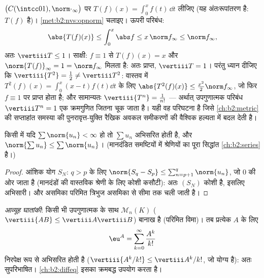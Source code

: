 \begin{example}[समाकलन का संकारक मानदंड]\label{ex:b2:nvs:integrationnorm}
$\bigl(C(\intcc01), \norm\cdot_\infty\bigr)$ पर $T(f)(x) =
\int_0^x f(t)\,\dd t$ लीजिए (यह अंतःरूपांतरण है: $T(f)$  है)। \cref{met:b2:nvs:opnorm} चलाइए। ऊपरी
परिबंध:
\[
\abs{T(f)(x)} \leq \int_0^x\abs f \leq x\,\norm f_\infty \leq
\norm f_\infty ,
\]
अतः $\vertiii T \leq 1$। साक्षी: $f \equiv 1$ से $T(f)(x) =
x$ और $\norm{T(f)}_\infty = 1 = \norm f_\infty$ मिलता है: अतः प्राप्त, $\vertiii T = 1$। परंतु
ध्यान दीजिए कि $\vertiii{T^2} = \frac12 \neq
\vertiii T^2$: वास्तव में $T^2(f)(x) = \int_0^x(x - t)f(t)\dd t$ के लिए $\abs{T^2(f)(x)} \leq \frac{x^2}2\norm f_\infty$, जो फिर $f \equiv 1$ पर
प्राप्त होता है; और सामान्यतः $\vertiii{T^n} = \frac1{n!}$ --- अर्थात् उपगुणात्मक परिबंध $\vertiii T^n = 1$
एक क्रमगुणित जितना चूक जाता है। यही वह परिघटना है जिसे \cref{ch:b2:metric} की
सप्ताहांत समस्या की पुनरावृत्त-युक्ति रैखिक अवकल समीकरणों की वैश्विक
हल्यता में बदल देती है।
\end{example}

\begin{theorem}\label{thm:b2:nvs:absoluteconvergence}
किसी  में यदि $\sum \norm{u_n} < \infty$ हो तो $\sum u_n$ अभिसरित होती है, और $\norm{\sum u_n} \leq \sum\norm{u_n}$।
(मानदंडित समष्टियों में श्रेणियों का पूरा सिद्धांत \cref{ch:b2:series} है।)
\end{theorem}

\begin{proof}
आंशिक योग $S_N$: $q > p$ के लिए $\norm{S_q - S_p} \leq
\sum_{n=p+1}^{q}\norm{u_n}$, जो $0$ की ओर जाता है (मानदंडों की
वास्तविक श्रेणी के लिए कोशी कसौटी): अतः $(S_N)$ कोशी है, इसलिए अभिसारी। और
असमिका परिमित त्रिभुज असमिका से सीमा तक चली जाती है।
\end{proof}

\begin{example}[आव्यूह घातांकी, पहला परिचय]\label{ex:b2:nvs:matrixexp}
\emph{आव्यूह घातांकी}: किसी भी उपगुणात्मक 
के साथ $\mathcal{M}_n(K)$ ($\vertiii{AB}
\leq \vertiii A \vertiii B$) बानाख है (परिमित विमा)। तब प्रत्येक $A$ के लिए
\[
\eu^A = \sum_{k=0}^{\infty} \frac{A^k}{k!}
\]
निरपेक्ष रूप से अभिसरित होती है ($\vertiii{A^k/k!} \leq \vertiii A^k /k!$, जो योग्य है): अतः सुपरिभाषित।
\cref{ch:b2:diffeq} इसका क्रमबद्ध उपयोग करता है।
\end{example}

